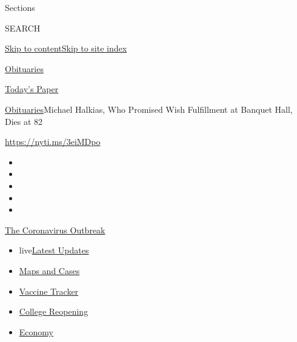 Sections

SEARCH

\protect\hyperlink{site-content}{Skip to
content}\protect\hyperlink{site-index}{Skip to site index}

\href{https://www.nytimes.com/section/obituaries}{Obituaries}

\href{https://myaccount.nytimes.com/auth/login?response_type=cookie\&client_id=vi}{}

\href{https://www.nytimes.com/section/todayspaper}{Today's Paper}

\href{/section/obituaries}{Obituaries}\textbar{}Michael Halkias, Who
Promised Wish Fulfillment at Banquet Hall, Dies at 82

\url{https://nyti.ms/3eiMDpo}

\begin{itemize}
\item
\item
\item
\item
\item
\end{itemize}

\href{https://www.nytimes.com/news-event/coronavirus?action=click\&pgtype=Article\&state=default\&region=TOP_BANNER\&context=storylines_menu}{The
Coronavirus Outbreak}

\begin{itemize}
\tightlist
\item
  live\href{https://www.nytimes.com/2020/08/03/world/coronavirus-covid-19.html?action=click\&pgtype=Article\&state=default\&region=TOP_BANNER\&context=storylines_menu}{Latest
  Updates}
\item
  \href{https://www.nytimes.com/interactive/2020/us/coronavirus-us-cases.html?action=click\&pgtype=Article\&state=default\&region=TOP_BANNER\&context=storylines_menu}{Maps
  and Cases}
\item
  \href{https://www.nytimes.com/interactive/2020/science/coronavirus-vaccine-tracker.html?action=click\&pgtype=Article\&state=default\&region=TOP_BANNER\&context=storylines_menu}{Vaccine
  Tracker}
\item
  \href{https://www.nytimes.com/2020/08/02/us/covid-college-reopening.html?action=click\&pgtype=Article\&state=default\&region=TOP_BANNER\&context=storylines_menu}{College
  Reopening}
\item
  \href{https://www.nytimes.com/live/2020/08/03/business/stock-market-today-coronavirus?action=click\&pgtype=Article\&state=default\&region=TOP_BANNER\&context=storylines_menu}{Economy}
\end{itemize}

